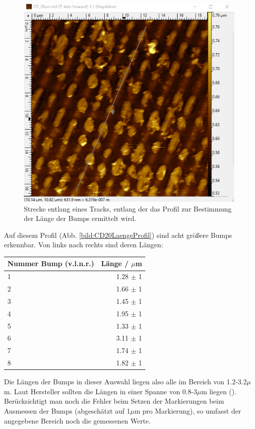 \begin{figure}[h]
    \centering
    \includegraphics[scale = 0.5]{Bilder/CD20Laenge.png}
    \caption{Strecke entlang eines Tracks, entlang der das Profil zur Bestimmung der Länge der Bumps ermittelt wird.}
    \label{bild:CD20Laenge}
\end{figure}


\newpage

Auf diesem Profil (Abb. \ref{bild:CD20LaengeProfil}) sind acht größere Bumps erkennbar. Von links nach rechts 
sind deren Längen: 

\begin{center}
    \centering
    \begin{tabular}{l|r}
        Nummer Bump (v.l.n.r.) & Länge / $\mu$m \\
        \hline
        1 & 1.28 $\pm$ 1\\
        2 & 1.66 $\pm$ 1\\
        3 & 1.45 $\pm$ 1\\
        4 & 1.95 $\pm$ 1\\
        5 & 1.33 $\pm$ 1\\
        6 & 3.11 $\pm$ 1\\
        7 & 1.74 $\pm$ 1\\
        8 & 1.82 $\pm$ 1\\
        
    \end{tabular}
\end{center}

Die Längen der Bumps in dieser Auswahl liegen also alle im Bereich von 1.2-3.2$\mu$m. Laut Hersteller sollten die Längen in einer Spanne von 
0.8-3$\mu$m liegen (\cite{SampleKit2007}). 
Berücksichtigt man noch die Fehler beim Setzen der Markierungen beim Ausmessen der Bumps (abgeschätzt auf 1$\mu$m 
pro Markierung), so umfasst der angegebene Bereich noch die gemessenen Werte. 
\clearpage